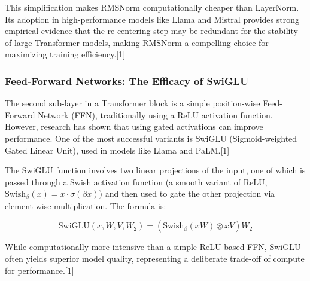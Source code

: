 \documentclass[12pt, a4paper]{article}
\begin{document}
This simplification makes RMSNorm computationally cheaper than LayerNorm. Its adoption in high-performance models like Llama and Mistral provides strong empirical evidence that the re-centering step may be redundant for the stability of large Transformer models, making RMSNorm a compelling choice for maximizing training efficiency.[1]

\begin{table}[h!]
\centering
\caption{Comparison of Normalization Layers}
\label{tab:norm_layers}
\end{table}

\subsubsection{Feed-Forward Networks: The Efficacy of SwiGLU}

The second sub-layer in a Transformer block is a simple position-wise Feed-Forward Network (FFN), traditionally using a ReLU activation function. However, research has shown that using gated activations can improve performance. One of the most successful variants is SwiGLU (Sigmoid-weighted Gated Linear Unit), used in models like Llama and PaLM.[1]

The SwiGLU function involves two linear projections of the input, one of which is passed through a Swish activation function (a smooth variant of ReLU, $\text{Swish}_\beta(x) = x \cdot \sigma(\beta x)$) and then used to gate the other projection via element-wise multiplication. The formula is:

$$\text{SwiGLU}(x, W, V, W_2) = (\text{Swish}_\beta(xW) \otimes xV)W_2$$

While computationally more intensive than a simple ReLU-based FFN, SwiGLU often yields superior model quality, representing a deliberate trade-off of compute for performance.[1]
\end{document}
